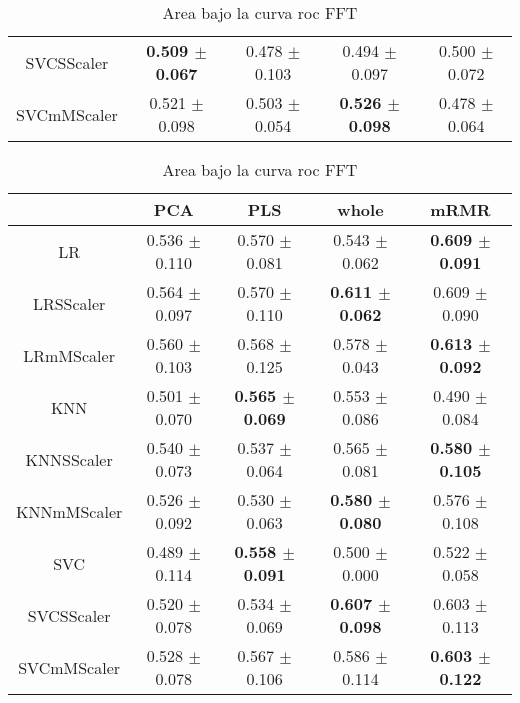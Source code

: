 \documentclass[]{report}
\begin{document}
\begin{table}
\begin{tabular}{c|cccc}
			 SVCSScaler  & \textbf{0.509 $\pm$ 0.067} & 0.478 $\pm$ 0.103 & 0.494 $\pm$ 0.097 & 0.500 $\pm$ 0.072 \\
			 SVCmMScaler & 0.521 $\pm$ 0.098 & 0.503 $\pm$ 0.054 & \textbf{0.526 $\pm$ 0.098} & 0.478 $\pm$ 0.064 \\
			\hline
		\end{tabular}
		\caption{\label{tab:auc_score_DCOR} Area bajo la curva roc DCOR}
		\vspace*{2cm}
		\begin{tabular}{c|cccc}
			\hline
			             & PCA             & PLS             & whole           & mRMR            \\
			\hline
			 LR          & 0.536 $\pm$ 0.110 & 0.570 $\pm$ 0.081 & 0.543 $\pm$ 0.062 & \textbf{0.609 $\pm$ 0.091} \\
			 LRSScaler   & 0.564 $\pm$ 0.097 & 0.570 $\pm$ 0.110 & \textbf{0.611 $\pm$ 0.062} & 0.609 $\pm$ 0.090 \\
			 LRmMScaler  & 0.560 $\pm$ 0.103 & 0.568 $\pm$ 0.125 & 0.578 $\pm$ 0.043 & \textbf{0.613 $\pm$ 0.092} \\
			 KNN         & 0.501 $\pm$ 0.070 & \textbf{0.565 $\pm$ 0.069} & 0.553 $\pm$ 0.086 & 0.490 $\pm$ 0.084 \\
			 KNNSScaler  & 0.540 $\pm$ 0.073 & 0.537 $\pm$ 0.064 & 0.565 $\pm$ 0.081 & \textbf{0.580 $\pm$ 0.105} \\
			 KNNmMScaler & 0.526 $\pm$ 0.092 & 0.530 $\pm$ 0.063 & \textbf{0.580 $\pm$ 0.080} & 0.576 $\pm$ 0.108 \\
			 SVC         & 0.489 $\pm$ 0.114 & \textbf{0.558 $\pm$ 0.091} & 0.500 $\pm$ 0.000 & 0.522 $\pm$ 0.058 \\
			 SVCSScaler  & 0.520 $\pm$ 0.078 & 0.534 $\pm$ 0.069 & \textbf{0.607 $\pm$ 0.098} & 0.603 $\pm$ 0.113 \\
			 SVCmMScaler & 0.528 $\pm$ 0.078 & 0.567 $\pm$ 0.106 & 0.586 $\pm$ 0.114 & \textbf{0.603 $\pm$ 0.122} \\
			\hline
		\end{tabular}
		\caption{\label{tab:auc_score_FFT} Area bajo la curva roc FFT}
		\vspace*{2cm}
	\end{table}
\end{document}
